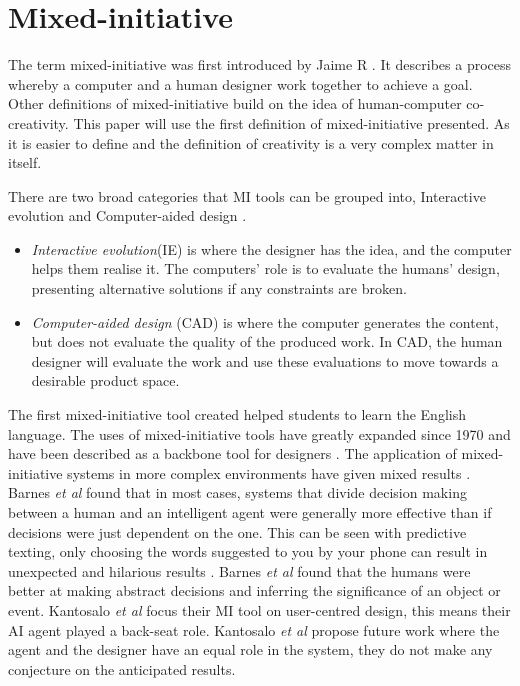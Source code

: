 \documentclass[journal]{IEEEtran}
\begin{document}
\section{Mixed-initiative} \label{MI}
The term mixed-initiative was first introduced by Jaime R \cite{carbonell1970mixed}.
It describes a process whereby a computer and a human designer work together to achieve a goal. Other definitions of mixed-initiative build on the idea of human-computer co-creativity. This paper will use the first definition of mixed-initiative presented. As it is easier to define and the definition of creativity is a very complex matter in itself. 

There are two broad categories that MI tools can be grouped into, Interactive evolution and Computer-aided design \cite{liapis2016mixed}. 
\begin{itemize}
    \item \textit{Interactive evolution}(IE) is where the designer has the idea,  and the computer helps them realise it. The computers' role is to evaluate the humans' design, presenting alternative solutions if any constraints are broken. 
    
    \item \textit{Computer-aided design} (CAD) is where the computer generates the content, but does not evaluate the quality of the produced work. In CAD, the human designer will evaluate the work and use these evaluations to move towards a desirable product space.
\end{itemize}

The first mixed-initiative tool created helped students to learn the English language. The uses of mixed-initiative tools have greatly expanded since 1970 and have been described as a backbone tool for designers \cite{alvarez2018fostering}. The application of mixed-initiative systems in more complex environments have given mixed results \cite{barnes2015designing}. Barnes \textit{et al}\cite{barnes2015designing} found that in most cases, systems that divide decision making between a human and an intelligent agent were generally more effective than if decisions were just dependent on the one. This can be seen with predictive texting,  only choosing the words suggested to you by your phone can result in unexpected and hilarious results \cite{quicktype}.  Barnes \textit{et al}\cite{barnes2015designing} found that the humans were better at making abstract decisions and inferring the significance of an object or event. Kantosalo \textit{et al}\cite{kantosalo2014isolation} focus their MI tool on user-centred design, this means their AI agent played a back-seat role. Kantosalo \textit{et al}\cite{kantosalo2014isolation} propose future work where the agent and the designer have an equal role in the system, they do not make any conjecture on the anticipated results.
\end{document}
